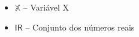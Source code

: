 \begin{itemize}[]
  \item $\mathbb{X}$ -- Variável X
  \item $\mathsf{I\!R}$ -- Conjunto dos números reais
\end{itemize}
